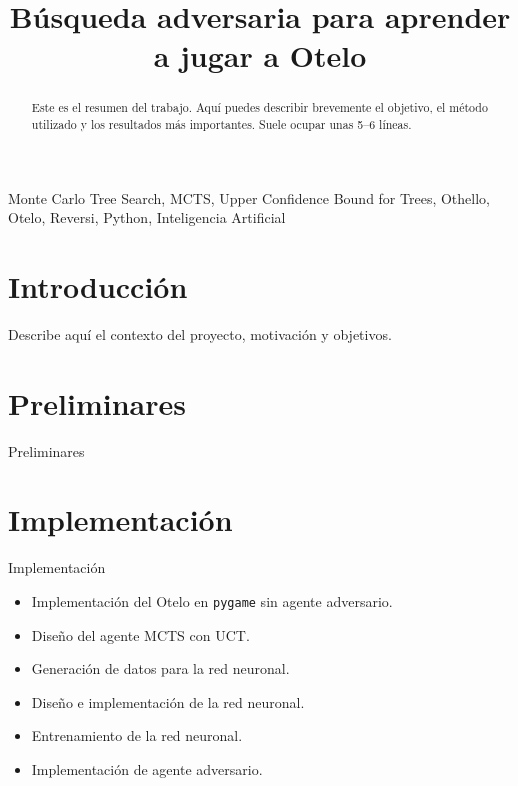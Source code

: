 \documentclass[conference]{IEEEtran}
\begin{document}
\title{Búsqueda adversaria para aprender a jugar a Otelo}

\author{
    \and
}

\maketitle

\begin{abstract}
Este es el resumen del trabajo. Aquí puedes describir brevemente el objetivo, el método utilizado y los resultados más importantes. Suele ocupar unas 5–6 líneas.
\end{abstract}

\begin{IEEEkeywords}
Monte Carlo Tree Search, MCTS, Upper Confidence Bound for Trees, Othello, Otelo, Reversi, Python, Inteligencia Artificial
\end{IEEEkeywords}

\section{Introducción}
Describe aquí el contexto del proyecto, motivación y objetivos.

\section{Preliminares}
Preliminares

\section{Implementación}
Implementación
\begin{itemize}
    \item Implementación del Otelo en \texttt{pygame} sin agente adversario.
    \item Diseño del agente MCTS con UCT.
    \item Generación de datos para la red neuronal.
    \item Diseño e implementación de la red neuronal.
    \item Entrenamiento de la red neuronal.
    \item Implementación de agente adversario.
\end{itemize}
\end{document}
